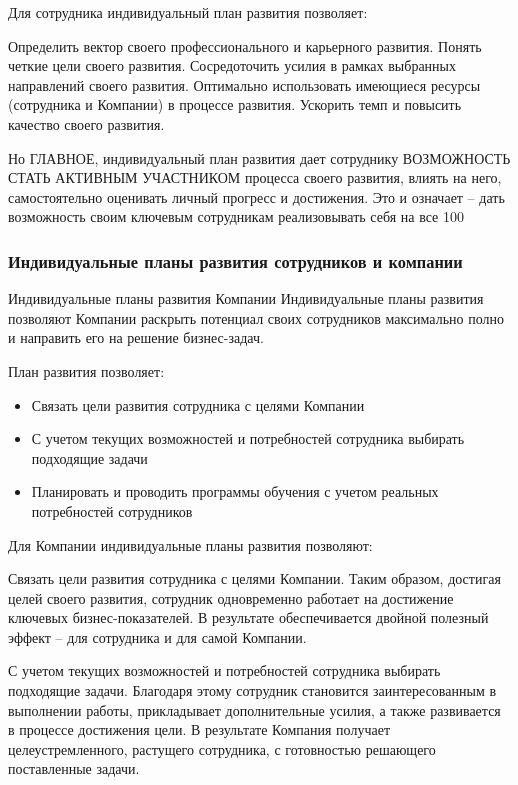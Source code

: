 \documentclass{../industrial-development}
\begin{document}
\lecturenotes
Для сотрудника индивидуальный план развития позволяет:

          Определить вектор своего профессионального и карьерного развития. Понять четкие цели своего развития. 
	Сосредоточить усилия в рамках выбранных направлений своего развития. 
	Оптимально использовать имеющиеся ресурсы (сотрудника и Компании) в процессе развития. 
	Ускорить темп и повысить качество своего развития. 

Но ГЛАВНОЕ, индивидуальный план развития дает сотруднику ВОЗМОЖНОСТЬ СТАТЬ АКТИВНЫМ УЧАСТНИКОМ процесса своего развития, влиять на него, самостоятельно оценивать личный прогресс и достижения. Это и означает – дать возможность своим ключевым сотрудникам реализовывать себя на все 100%


\begin{frame} \frametitle{Индивидуальные планы развития сотрудников и компании}
  \begin{block}{Индивидуальные планы развития Компании}
Индивидуальные планы развития позволяют Компании раскрыть потенциал своих сотрудников максимально полно и направить его на решение бизнес-задач.

План развития позволяет:
  \end{block}
  
   \begin{itemize}
  \item Связать цели развития сотрудника с целями Компании
  \item С учетом текущих возможностей и потребностей сотрудника выбирать подходящие задачи
  \item	 Планировать и проводить программы обучения с учетом реальных потребностей сотрудников 
  \end{itemize}
\end{frame}

\lecturenotes
Для Компании индивидуальные планы развития позволяют:

	Связать цели развития сотрудника с целями Компании. Таким образом, достигая целей своего развития, сотрудник одновременно работает на достижение ключевых бизнес-показателей. В результате обеспечивается двойной полезный эффект – для сотрудника и для самой Компании.

	С учетом текущих возможностей и потребностей сотрудника выбирать подходящие задачи. Благодаря этому сотрудник становится заинтересованным в выполнении работы, прикладывает дополнительные усилия, а также развивается в процессе достижения цели. В результате Компания получает целеустремленного, растущего сотрудника, с готовностью решающего поставленные задачи.
\end{document}

